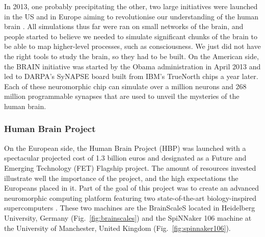 In 2013, one probably precipitating the other, two large initiatives were launched in the US and in Europe aiming to revolutionise our understanding of the human brain \cite{theeco}. All simulations thus far were ran on small networks of the brain, and people started to believe we needed to simulate significant chunks of the brain to be able to map higher-level processes, such as consciousness. We just did not have the right tools to study the brain, so they had to be built. On the American side, the BRAIN initiative was started by the Obama administration in April 2013 \cite{brain} and led to DARPA's SyNAPSE board built from IBM's TrueNorth chips a year later. Each of these neuromorphic chip can simulate over a million neurons and 268 million programmable synapses \cite{truenorth} that are used to unveil the mysteries of the human brain. \\

\subsubsection{Human Brain Project} \label{sec:hbp}

On the European side, the Human Brain Project (HBP) was launched with a spectacular projected cost of 1.3 billion euros and designated as a Future and Emerging Technology (FET) Flagship project. The amount of resources invested illustrate well the importance of the project, and the high expectations the Europeans placed in it. Part of the goal of this project was to create an advanced neuromorphic computing platform featuring two state-of-the-art biology-inspired supercomputers \cite{nmp} \cite{ncp}. These two machines are the BrainScaleS located in Heidelberg University, Germany (Fig.~\ref{fig:brainscales}) and the SpiNNaker 106 machine at the University of Manchester, United Kingdom (Fig.~\ref{fig:spinnaker106}).

